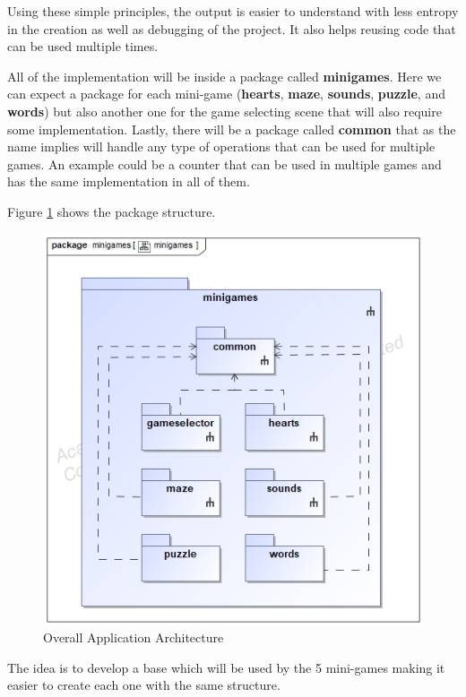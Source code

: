 Using these simple principles, the output is easier to understand with less entropy in the creation as well as debugging of the project. It also helps reusing code that can be used multiple times.

All of the implementation will be inside a package called \textbf{minigames}. Here we can expect a package for each mini-game (\textbf{hearts}, \textbf{maze}, \textbf{sounds}, \textbf{puzzle}, and \textbf{words}) but also another one for the game selecting scene that will also require some implementation. Lastly, there will be a package called \textbf{common} that as the name implies will handle any type of operations that can be used for multiple games. An example could be a counter that can be used in multiple games and has the same implementation in all of them.


\newpage
Figure \ref{fig:packages} shows the package structure.

\begin{figure}[H]
    \centering
    \includegraphics[scale=.5]{Chapters/arq/class__minigames__minigames.jpg}
    \caption{Overall Application Architecture}
    \label{fig:packages}
\end{figure}

The idea is to develop a base which will be used by the 5 mini-games making it easier to create each one with the same structure. 

